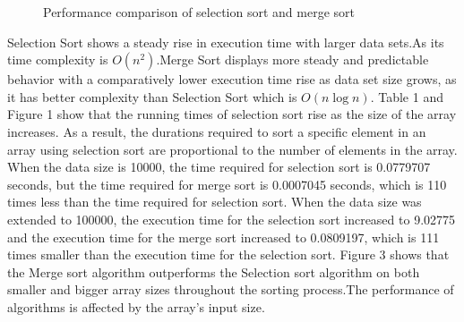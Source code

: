\documentclass[twocolumn]{article}
\begin{document}
\begin{figure}[htp]
    \centering
    \caption{Performance comparison of selection sort and merge sort}
    \label{selection-merge-and-sort-graph}
\end{figure}

Selection Sort shows a steady rise in execution time with larger data sets.As its time complexity is $O(n^2)$.Merge Sort displays more steady and predictable behavior with a comparatively lower execution time rise as data set size grows, as it has better complexity than Selection Sort which is $O(n\log{n})$.
Table 1 and Figure 1 show that the running times of selection sort rise as the size of the array increases\cite{rabiu2018}. As a result, the durations required to sort a specific element in an array using selection sort are proportional to the number of elements in the array.
When the data size is 10000, the time required for selection sort is 0.0779707 seconds, but the time required for merge sort is 0.0007045 seconds, which is 110 times less than the time required for selection sort. When the data size was extended to 100000, the execution time for the selection sort increased to 9.02775 and the execution time for the merge sort increased to 0.0809197, which is 111 times smaller than the execution time for the selection sort.
Figure 3 shows that the Merge sort algorithm outperforms the Selection sort algorithm on both smaller and bigger array sizes throughout the sorting process.The performance of algorithms is affected by the array's input size\cite{rabiu2020}.
\end{document}
